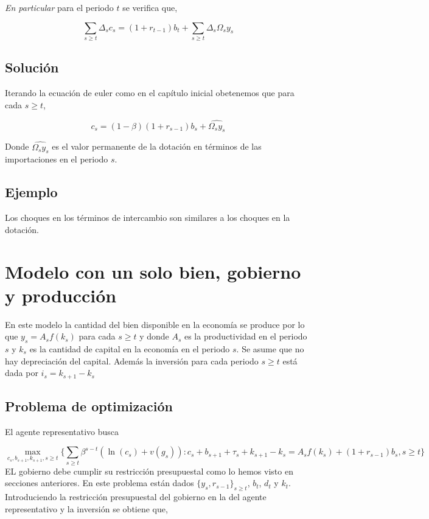\documentclass[]{article}
\begin{document}
\emph{En particular} para el periodo \(t\) se verifica que,

\[
\sum_{s \geq t} \Delta_s c_s = (1+r_{t-1})b_t + \sum_{s \geq t} \Delta_s \Omega_s y_s
\]

\subsection{Solución}\label{solucion-2}

Iterando la ecuación de euler como en el capítulo inicial obetenemos que
para cada \(s \geq t\),

\[
c_s = (1-\beta)(1+r_{s-1})b_s + \widehat{\Omega_s y_s}
\]

Donde \(\hat{\Omega_s y_s}\) es el valor permanente de la dotación en
términos de las importaciones en el periodo \(s\).

\subsection{Ejemplo}\label{ejemplo-2}

Los choques en los términos de intercambio son similares a los choques
en la dotación.

\section{Modelo con un solo bien, gobierno y
producción}\label{modelo-con-un-solo-bien-gobierno-y-produccion}

En este modelo la cantidad del bien disponible en la economía se produce
por lo que \(y_s = A_sf(k_s)\) para cada \(s \geq t\) y donde \(A_s\) es
la productividad en el periodo \(s\) y \(k_s\) es la cantidad de capital
en la economía en el periodo \(s\). Se asume que no hay depreciación del
capital. Además la inversión para cada periodo \(s \geq t\) está dada
por \(i_s = k_{s+1} - k_s\)

\subsection{Problema de optimización}\label{problema-de-optimizacion-3}

El agente representativo busca

\[
\max_{c_s,b_{s+1}, k_{s+1}, s \geq t} \{ \sum_{s \geq t} \beta^{s-t}(\ln(c_s) + v(g_s)):c_s + b_{s+1} + \tau_s + k_{s+1}-k_s = A_sf(k_s) + (1+r_{s-1})b_s, s\geq t\}
\] EL gobierno debe cumplir su restricción presupuestal como lo hemos
visto en secciones anteriores. En este problema están dados
\(\{y_s, r_{s-1}\}_{s\geq t}\), \(b_t\), \(d_t\) y \(k_t\).
Introduciendo la restricción presupuestal del gobierno en la del agente
representativo y la inversión se obtiene que,
\end{document}
